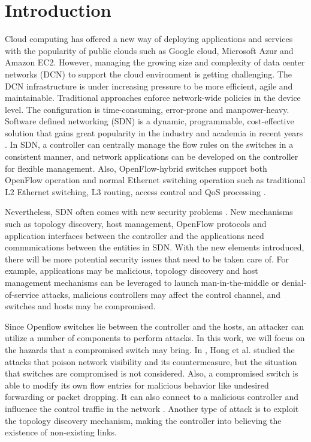 \chapter{Introduction}
\label{chap:intro}
\setcounter{page}{1}

Cloud computing has offered a new way of deploying applications and services with the popularity of public clouds such as Google cloud, Microsoft Azur and Amazon EC2. However, managing the growing size and complexity of data center networks (DCN) to support the cloud environment is getting challenging. The DCN infrastructure is under increasing pressure to be more efficient, agile and maintainable. Traditional approaches enforce network-wide policies in the device level. The configuration is time-consuming, error-prone and manpower-heavy. Software defined networking (SDN) is a dynamic, programmable, cost-effective solution that gains great popularity in the industry and academia in recent years \cite{KRVRAU15, MABPPRST08, LHM10}. In SDN, a controller can centrally manage the flow rules on the switches in a consistent manner, and network applications can be developed on the controller for flexible management. Also, OpenFlow-hybrid switches support both OpenFlow operation and normal Ethernet switching operation such as traditional L2 Ethernet switching, L3 routing, access control and QoS processing \cite{OF_SPEC}.

Nevertheless, SDN often comes with new security problems \cite{SOS13,CM}. New mechanisms such as topology discovery, host management, OpenFlow protocols and application interfaces between the controller and the applications need communications between the entities in SDN. With the new elements introduced, there will be more potential security issues that need to be taken care of. For example, applications may be malicious, topology discovery and host management mechanisms can be leveraged to launch man-in-the-middle or denial-of-service attacks, malicious controllers may affect the control channel, and switches and hosts may be compromised.

Since Openflow switches lie between the controller and the hosts, an attacker can utilize a number of components to perform attacks. In this work, we will focus on the hazards that a compromised switch may bring. In \cite{HXWG15}, Hong et al. studied the attacks that poison network visibility and its countermeasure, but the situation that switches are compromised is not considered. Also, a compromised switch is able to modify its own flow entries for malicious behavior like undesired forwarding or packet dropping. It can also connect to a malicious controller and influence the control traffic in the network . Another type of attack is to exploit the topology discovery mechanism, making the controller into believing the existence of non-existing links.

